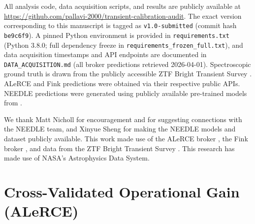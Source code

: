 \documentclass[twocolumn]{aastex631}
\begin{document}
All analysis code, data acquisition scripts, and results are publicly
available at \url{https://github.com/pallavi-2000/transient-calibration-audit}.
The exact version corresponding to this manuscript is tagged as
\texttt{v1.0-submitted} (commit hash \texttt{be9c6f9}).
A pinned Python environment is provided in \texttt{requirements.txt}
(Python 3.8.0; full dependency freeze in
\texttt{requirements\_frozen\_full.txt}), and data acquisition timestamps
and API endpoints are documented in \texttt{DATA\_ACQUISITION.md}
(all broker predictions retrieved 2026-04-01).
Spectroscopic ground truth is drawn from the publicly accessible ZTF
Bright Transient Survey \citep{fremling2020, perley2020}. ALeRCE and
Fink predictions were obtained via their respective public APIs. NEEDLE
predictions were generated using publicly available pre-trained models
from \citet{sheng2024}.


\begin{acknowledgments}
We thank Matt Nicholl for encouragement and for suggesting connections with the NEEDLE team, and Xinyue Sheng for making the NEEDLE models and dataset publicly available. This work made use of the ALeRCE broker \citep{forster2021}, the Fink broker \citep{moller2021}, and data from the ZTF Bright Transient Survey \citep{fremling2020, perley2020}. This research has made use of NASA's Astrophysics Data System.
\end{acknowledgments}







\appendix

\section{Cross-Validated Operational Gain (ALeRCE)} \label{app:cv}
\end{document}
